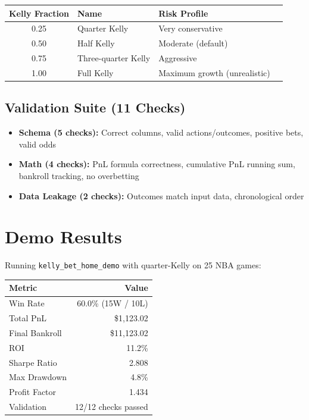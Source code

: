 \documentclass[11pt,a4paper]{article}
\begin{document}
\begin{table}[h]
\centering
\begin{tabular}{@{}clll@{}}
\toprule
\textbf{Kelly Fraction} & \textbf{Name} & \textbf{Risk Profile} \\
\midrule
0.25 & Quarter Kelly & Very conservative \\
0.50 & Half Kelly & Moderate (default) \\
0.75 & Three-quarter Kelly & Aggressive \\
1.00 & Full Kelly & Maximum growth (unrealistic) \\
\bottomrule
\end{tabular}
\end{table}

\subsection{Validation Suite (11 Checks)}

\begin{itemize}[nosep]
    \item \textbf{Schema (5 checks):} Correct columns, valid actions/outcomes, positive bets, valid odds
    \item \textbf{Math (4 checks):} PnL formula correctness, cumulative PnL running sum, bankroll tracking, no overbetting
    \item \textbf{Data Leakage (2 checks):} Outcomes match input data, chronological order
\end{itemize}

\section{Demo Results}

Running \texttt{kelly\_bet\_home\_demo} with quarter-Kelly on 25 NBA games:

\begin{table}[h]
\centering
\begin{tabular}{@{}lr@{}}
\toprule
\textbf{Metric} & \textbf{Value} \\
\midrule
Win Rate & 60.0\% (15W / 10L) \\
Total PnL & \$1,123.02 \\
Final Bankroll & \$11,123.02 \\
ROI & 11.2\% \\
Sharpe Ratio & 2.808 \\
Max Drawdown & 4.8\% \\
Profit Factor & 1.434 \\
Validation & 12/12 checks passed \\
\bottomrule
\end{tabular}
\end{table}
\end{document}
